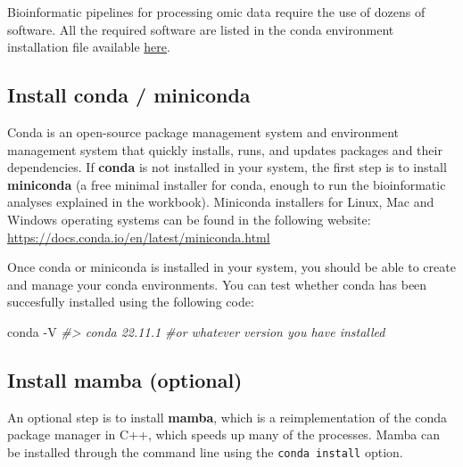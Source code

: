 \documentclass[
]{book}
\newenvironment{Shaded}{\begin{snugshade}}{\end{snugshade}}
\newcommand{\AttributeTok}[1]{\textcolor[rgb]{0.13,0.29,0.53}{#1}}
\newcommand{\CommentTok}[1]{\textcolor[rgb]{0.56,0.35,0.01}{\textit{#1}}}
\newcommand{\ExtensionTok}[1]{#1}
\begin{document}
Bioinformatic pipelines for processing omic data require the use of dozens of software. All the required software are listed in the conda environment installation file available \href{https://raw.githubusercontent.com/holo-omics/holo-omics.github.io/main/bin/holo-omics-env.yaml}{here}.

\hypertarget{install-conda-miniconda}{%
\subsection*{Install conda / miniconda}\label{install-conda-miniconda}}

Conda is an open-source package management system and environment management system that quickly installs, runs, and updates packages and their dependencies. If \textbf{conda} is not installed in your system, the first step is to install \textbf{miniconda} (a free minimal installer for conda, enough to run the bioinformatic analyses explained in the workbook). Miniconda installers for Linux, Mac and Windows operating systems can be found in the following website:
\url{https://docs.conda.io/en/latest/miniconda.html}

Once conda or miniconda is installed in your system, you should be able to create and manage your conda environments. You can test whether conda has been succesfully installed using the following code:

\small

\begin{Shaded}
\begin{Highlighting}[]
\ExtensionTok{conda} \AttributeTok{{-}V}
\CommentTok{\#\textgreater{} conda 22.11.1 \#or whatever version you have installed}
\end{Highlighting}
\end{Shaded}

\normalsize

\hypertarget{install-mamba}{%
\subsection*{Install mamba (optional)}\label{install-mamba}}

An optional step is to install \textbf{mamba}, which is a reimplementation of the conda package manager in C++, which speeds up many of the processes. Mamba can be installed through the command line using the \texttt{conda\ install} option.
\end{document}
